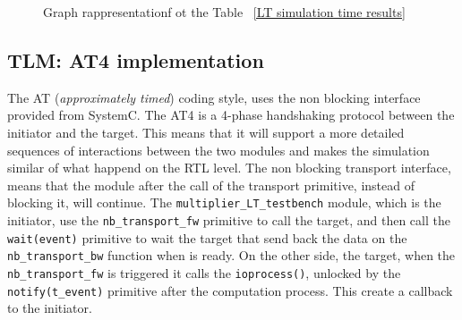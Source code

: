 \documentclass[]{IEEEtran}
\begin{document}
		\begin{figure}

	
				\centering
	\caption{Graph rappresentationf ot the Table ~\ref{LT simulation time results}}
	\label{ltplot}
\end{figure}

	\subsection{TLM: AT4 implementation}
\label{sec:at4}
The AT (\textit{approximately timed}) coding style, uses the non blocking interface provided from SystemC. The AT4 is a 4-phase handshaking protocol between the initiator and the target. This means that it will support a more detailed sequences of interactions between the two modules and makes the simulation similar of what happend on the RTL level. The non blocking transport interface, means that the module after the call of the transport primitive, instead of blocking it, will continue. 
The \verb|multiplier_LT_testbench| module, which is the initiator, use the \verb|nb_transport_fw| primitive to call the target, and then call the \verb|wait(event)| primitive to wait the target that send back the data on the \verb|nb_transport_bw| function when is ready.
On the other side, the target, when the \verb|nb_transport_fw| is triggered it calls the \verb|ioprocess()|, unlocked by the  \verb|notify(t_event)| primitive after the computation process. This create a callback to the initiator. 
\end{document}

